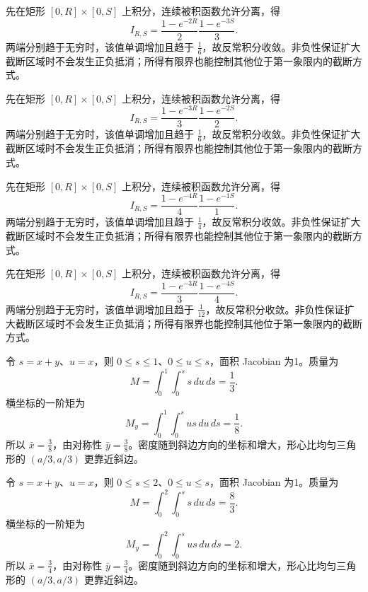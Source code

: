 \documentclass[12pt,fontset=fandol]{ctexart}
\begin{document}
\begin{solve}\label{ans:c40q3}
先在矩形 $[0,R]\times[0,S]$ 上积分，连续被积函数允许分离，得
\[
I_{R,S}=\frac{1-e^{-2R}}{2}\frac{1-e^{-3S}}{3}.
\]
两端分别趋于无穷时，该值单调增加且趋于 $\frac{1}{6}$，故反常积分收敛。非负性保证扩大截断区域时不会发生正负抵消；所得有限界也能控制其他位于第一象限内的截断方式。
\end{solve}

\begin{solve}\label{ans:c40q4}
先在矩形 $[0,R]\times[0,S]$ 上积分，连续被积函数允许分离，得
\[
I_{R,S}=\frac{1-e^{-3R}}{3}\frac{1-e^{-2S}}{2}.
\]
两端分别趋于无穷时，该值单调增加且趋于 $\frac{1}{6}$，故反常积分收敛。非负性保证扩大截断区域时不会发生正负抵消；所得有限界也能控制其他位于第一象限内的截断方式。
\end{solve}

\begin{solve}\label{ans:c40q5}
先在矩形 $[0,R]\times[0,S]$ 上积分，连续被积函数允许分离，得
\[
I_{R,S}=\frac{1-e^{-4R}}{4}\frac{1-e^{-1S}}{1}.
\]
两端分别趋于无穷时，该值单调增加且趋于 $\frac{1}{4}$，故反常积分收敛。非负性保证扩大截断区域时不会发生正负抵消；所得有限界也能控制其他位于第一象限内的截断方式。
\end{solve}

\begin{solve}\label{ans:c40q6}
先在矩形 $[0,R]\times[0,S]$ 上积分，连续被积函数允许分离，得
\[
I_{R,S}=\frac{1-e^{-3R}}{3}\frac{1-e^{-4S}}{4}.
\]
两端分别趋于无穷时，该值单调增加且趋于 $\frac{1}{12}$，故反常积分收敛。非负性保证扩大截断区域时不会发生正负抵消；所得有限界也能控制其他位于第一象限内的截断方式。
\end{solve}

\begin{solve}\label{ans:c40q7}
令 $s=x+y$、$u=x$，则 $0\le s\le 1$、$0\le u\le s$，面积 Jacobian 为1。质量为
\[
M=\int_0^{1}\int_0^s s\,du\,ds=\frac{1}{3}.
\]
横坐标的一阶矩为
\[
M_y=\int_0^{1}\int_0^s us\,du\,ds=\frac{1}{8}.
\]
所以 $\bar x=\frac{3}{8}$，由对称性 $\bar y=\frac{3}{8}$。密度随到斜边方向的坐标和增大，形心比均匀三角形的 $(a/3,a/3)$ 更靠近斜边。
\end{solve}

\begin{solve}\label{ans:c40q8}
令 $s=x+y$、$u=x$，则 $0\le s\le 2$、$0\le u\le s$，面积 Jacobian 为1。质量为
\[
M=\int_0^{2}\int_0^s s\,du\,ds=\frac{8}{3}.
\]
横坐标的一阶矩为
\[
M_y=\int_0^{2}\int_0^s us\,du\,ds=2.
\]
所以 $\bar x=\frac{3}{4}$，由对称性 $\bar y=\frac{3}{4}$。密度随到斜边方向的坐标和增大，形心比均匀三角形的 $(a/3,a/3)$ 更靠近斜边。
\end{solve}
\end{document}
